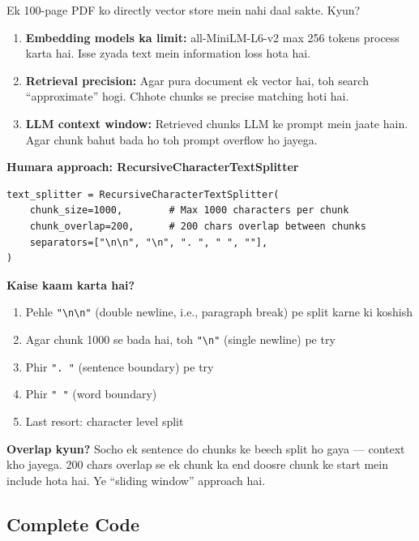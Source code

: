 \documentclass[12pt, a4paper]{article}
\begin{document}
\begin{conceptbox}[title={\faIcon{brain} ~Kyun Chunking Zaroori Hai?}]
Ek 100-page PDF ko directly vector store mein nahi daal sakte. Kyun?
\begin{enumerate}
\item \textbf{Embedding models ka limit:} all-MiniLM-L6-v2 max 256 tokens process karta hai. Isse zyada text mein information loss hota hai.
\item \textbf{Retrieval precision:} Agar pura document ek vector hai, toh search ``approximate'' hogi. Chhote chunks se precise matching hoti hai.
\item \textbf{LLM context window:} Retrieved chunks LLM ke prompt mein jaate hain. Agar chunk bahut bada ho toh prompt overflow ho jayega.
\end{enumerate}

\textbf{Humara approach: RecursiveCharacterTextSplitter}
\begin{lstlisting}[style=pythonstyle]
text_splitter = RecursiveCharacterTextSplitter(
    chunk_size=1000,        # Max 1000 characters per chunk
    chunk_overlap=200,      # 200 chars overlap between chunks
    separators=["\n\n", "\n", ". ", " ", ""],
)
\end{lstlisting}

\textbf{Kaise kaam karta hai?}
\begin{enumerate}
\item Pehle \texttt{"\textbackslash n\textbackslash n"} (double newline, i.e., paragraph break) pe split karne ki koshish
\item Agar chunk 1000 se bada hai, toh \texttt{"\textbackslash n"} (single newline) pe try
\item Phir \texttt{". "} (sentence boundary) pe try
\item Phir \texttt{" "} (word boundary)
\item Last resort: character level split
\end{enumerate}

\textbf{Overlap kyun?} Socho ek sentence do chunks ke beech split ho gaya --- context kho jayega. 200 chars overlap se ek chunk ka end doosre chunk ke start mein include hota hai. Ye ``sliding window'' approach hai.
\end{conceptbox}

\subsection{Complete Code}
\end{document}
